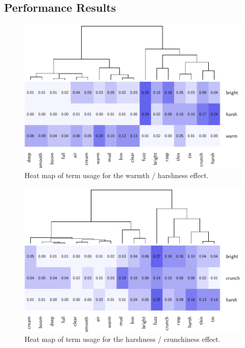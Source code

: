 	\subsection{Performance Results}
	\label{sec:PerceptualExperiments-SemanticControl-PerformanceResults}

		\begin{figure}[h!]
			\centering
			\includegraphics{chapter7/Images/HarshConfusion.pdf}
			\caption{Heat map of term usage for the warmth / harshness effect.}
		\end{figure}

		\begin{figure}[h!]
			\centering
			\includegraphics{chapter7/Images/CrunchConfusion.pdf}
			\caption{Heat map of term usage for the harshness / crunchiness effect.}
		\end{figure}

